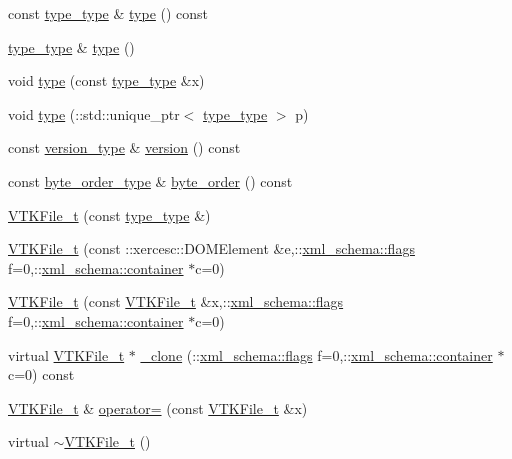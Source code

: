 \begin{DoxyCompactItemize}
\item 
const \hyperlink{classVTKFile__t_ac1f3484e4fde414849ede43a00955f76}{type\+\_\+type} \& \hyperlink{classVTKFile__t_a5c23301c79cc6a376fe2abce533b2cf7}{type} () const 
\item 
\hyperlink{classVTKFile__t_ac1f3484e4fde414849ede43a00955f76}{type\+\_\+type} \& \hyperlink{classVTKFile__t_abcc8ab822fa4f9e5e5294f5d8cff05c2}{type} ()
\item 
void \hyperlink{classVTKFile__t_a6423eb2dc7fa367417df87de4921301e}{type} (const \hyperlink{classVTKFile__t_ac1f3484e4fde414849ede43a00955f76}{type\+\_\+type} \&x)
\item 
void \hyperlink{classVTKFile__t_ac2dec76d5784d0f937c95932d8792e12}{type} (\+::std\+::unique\+\_\+ptr$<$ \hyperlink{classVTKFile__t_ac1f3484e4fde414849ede43a00955f76}{type\+\_\+type} $>$ p)
\item 
const \hyperlink{classVTKFile__t_a7db6f6d11f363380d6361446f5dede7b}{version\+\_\+type} \& \hyperlink{classVTKFile__t_af0f1ed9d44019ad1fab6495b6ae71a47}{version} () const 
\item 
const \hyperlink{classVTKFile__t_ab08dd45c560dd0635d0e5c0a5e42d2e8}{byte\+\_\+order\+\_\+type} \& \hyperlink{classVTKFile__t_ad87b4f45ca18139b1ffae8ce08dc2e27}{byte\+\_\+order} () const 
\item 
\hyperlink{classVTKFile__t_a76547340cb91ad0019d45889ca69fda0}{V\+T\+K\+File\+\_\+t} (const \hyperlink{classVTKFile__t_ac1f3484e4fde414849ede43a00955f76}{type\+\_\+type} \&)
\item 
\hyperlink{classVTKFile__t_a5d1c8c263c9865fe6f4b6ae1446efcaf}{V\+T\+K\+File\+\_\+t} (const \+::xercesc\+::\+D\+O\+M\+Element \&e,\+::\hyperlink{namespacexml__schema_a0612287d030cb2732d31a45b258fdc87}{xml\+\_\+schema\+::flags} f=0,\+::\hyperlink{namespacexml__schema_ada9aa30dc722e93ee2ed7243085402a5}{xml\+\_\+schema\+::container} $\ast$c=0)
\item 
\hyperlink{classVTKFile__t_af239970202f0aee8392cb0af61863f62}{V\+T\+K\+File\+\_\+t} (const \hyperlink{classVTKFile__t}{V\+T\+K\+File\+\_\+t} \&x,\+::\hyperlink{namespacexml__schema_a0612287d030cb2732d31a45b258fdc87}{xml\+\_\+schema\+::flags} f=0,\+::\hyperlink{namespacexml__schema_ada9aa30dc722e93ee2ed7243085402a5}{xml\+\_\+schema\+::container} $\ast$c=0)
\item 
virtual \hyperlink{classVTKFile__t}{V\+T\+K\+File\+\_\+t} $\ast$ \hyperlink{classVTKFile__t_ad39ce94f7390685f9717fd521bac36e3}{\+\_\+clone} (\+::\hyperlink{namespacexml__schema_a0612287d030cb2732d31a45b258fdc87}{xml\+\_\+schema\+::flags} f=0,\+::\hyperlink{namespacexml__schema_ada9aa30dc722e93ee2ed7243085402a5}{xml\+\_\+schema\+::container} $\ast$c=0) const 
\item 
\hyperlink{classVTKFile__t}{V\+T\+K\+File\+\_\+t} \& \hyperlink{classVTKFile__t_a0f2e74c4753d5c47f9e358ed50b4d2a3}{operator=} (const \hyperlink{classVTKFile__t}{V\+T\+K\+File\+\_\+t} \&x)
\item 
virtual \hyperlink{classVTKFile__t_ac5cf95c81660088dbb3c9ab6cd78dede}{$\sim$\+V\+T\+K\+File\+\_\+t} ()
\end{DoxyCompactItemize}
